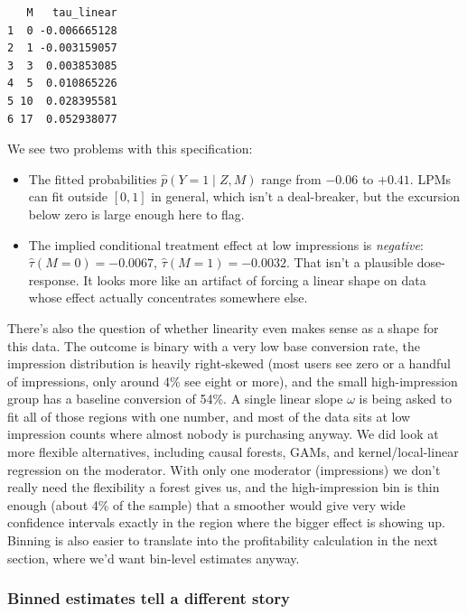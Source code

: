 \begin{verbatim}
   M   tau_linear
1  0 -0.006665128
2  1 -0.003159057
3  3  0.003853085
4  5  0.010865226
5 10  0.028395581
6 17  0.052938077
\end{verbatim}

We see two problems with this specification:

\begin{itemize}
\tightlist
\item
  The fitted probabilities \(\hat p(Y=1 \mid Z, M)\) range from
  \(-0.06\) to \(+0.41\). LPMs can fit outside \([0,1]\) in general,
  which isn't a deal-breaker, but the excursion below zero is large
  enough here to flag.
\item
  The implied conditional treatment effect at low impressions is
  \emph{negative}: \(\hat\tau(M=0) = -0.0067\),
  \(\hat\tau(M=1) = -0.0032\). That isn't a plausible dose-response. It
  looks more like an artifact of forcing a linear shape on data whose
  effect actually concentrates somewhere else.
\end{itemize}

There's also the question of whether linearity even makes sense as a
shape for this data. The outcome is binary with a very low base
conversion rate, the impression distribution is heavily right-skewed
(most users see zero or a handful of impressions, only around 4\% see
eight or more), and the small high-impression group has a baseline
conversion of 54\%. A single linear slope \(\omega\) is being asked to
fit all of those regions with one number, and most of the data sits at
low impression counts where almost nobody is purchasing anyway. We did
look at more flexible alternatives, including causal forests, GAMs, and
kernel/local-linear regression on the moderator. With only one moderator
(impressions) we don't really need the flexibility a forest gives us,
and the high-impression bin is thin enough (about 4\% of the sample)
that a smoother would give very wide confidence intervals exactly in the
region where the bigger effect is showing up. Binning is also easier to
translate into the profitability calculation in the next section, where
we'd want bin-level estimates anyway.

\subsubsection{Binned estimates tell a different story}

